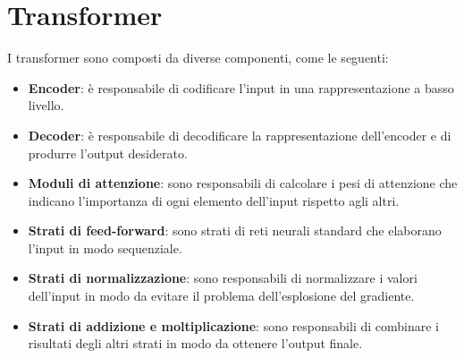 \documentclass{article}
\begin{document}
\section{Transformer}
I transformer sono composti da diverse componenti, come le seguenti:
\begin{itemize}
    \item \textbf{Encoder}: è responsabile di codificare l'input in una rappresentazione a basso livello.
    \item \textbf{Decoder}: è responsabile di decodificare la rappresentazione dell'encoder e di produrre l'output desiderato.
    \item \textbf{Moduli di attenzione}: sono responsabili di calcolare i pesi di attenzione che indicano l'importanza di ogni elemento dell'input rispetto agli altri.
    \item \textbf{Strati di feed-forward}: sono strati di reti neurali standard che elaborano l'input in modo sequenziale.
    \item \textbf{Strati di normalizzazione}: sono responsabili di normalizzare i valori dell'input in modo da evitare il problema dell'esplosione del gradiente.
    \item \textbf{Strati di addizione e moltiplicazione}: sono responsabili di combinare i risultati degli altri strati in modo da ottenere l'output finale.
\end{itemize}
\end{document}
